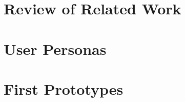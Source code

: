\documentclass[a4paper,10pt,draft]{article}
\begin{document}



\restoregeometry%

\newpage\null\thispagestyle{empty}\newpage
\setcounter{page}{0}
\tableofcontents
{}
\newpage

\section{Review of Related Work}
\label{sec:review_of_related_work}







\clearpage

\section{User Personas}
\label{sec:user_personas}



	
	
	
	


\section{First Prototypes}
\label{sec:first_prototypes}

	




\end{document}
